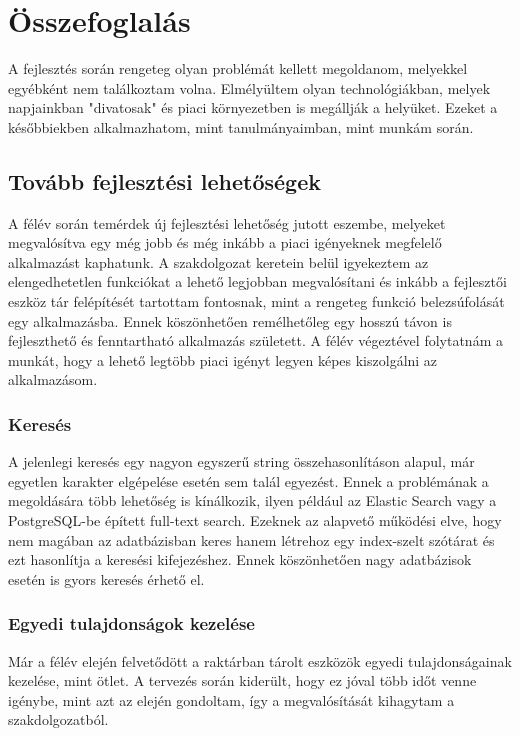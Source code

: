 \chapter{Összefoglalás}

A fejlesztés során rengeteg olyan problémát kellett megoldanom, melyekkel egyébként nem találkoztam volna.
Elmélyültem olyan technológiákban, melyek napjainkban "divatosak" és piaci környezetben is megállják a helyüket.
Ezeket a későbbiekben alkalmazhatom, mint tanulmányaimban, mint munkám során.

\section{Tovább fejlesztési lehetőségek}
A félév során temérdek új fejlesztési lehetőség jutott eszembe, melyeket megvalósítva egy még jobb és még inkább a piaci igényeknek megfelelő alkalmazást kaphatunk.
A szakdolgozat keretein belül igyekeztem az elengedhetetlen funkciókat a lehető legjobban megvalósítani és inkább a fejlesztői eszköz tár felépítését tartottam fontosnak, mint a rengeteg funkció belezsúfolását egy alkalmazásba.
Ennek köszönhetően remélhetőleg egy hosszú távon is fejleszthető és fenntartható alkalmazás született.
A félév végeztével folytatnám a munkát, hogy a lehető legtöbb piaci igényt legyen képes kiszolgálni az alkalmazásom.

\subsection{Keresés}
A jelenlegi keresés egy nagyon egyszerű string összehasonlításon alapul, már egyetlen karakter elgépelése esetén sem talál egyezést.
Ennek a problémának a megoldására több lehetőség is kínálkozik, ilyen például az Elastic Search vagy a PostgreSQL-be épített full-text search.
Ezeknek az alapvető működési elve, hogy nem magában az adatbázisban keres hanem létrehoz egy index-szelt szótárat és ezt hasonlítja a keresési kifejezéshez.
Ennek köszönhetően nagy adatbázisok esetén is gyors keresés érhető el.

\subsection{Egyedi tulajdonságok kezelése}
Már a félév elején felvetődött a raktárban tárolt eszközök egyedi tulajdonságainak kezelése, mint ötlet.
A tervezés során kiderült, hogy ez jóval több időt venne igénybe, mint azt az elején gondoltam, így a megvalósítását kihagytam a szakdolgozatból.

